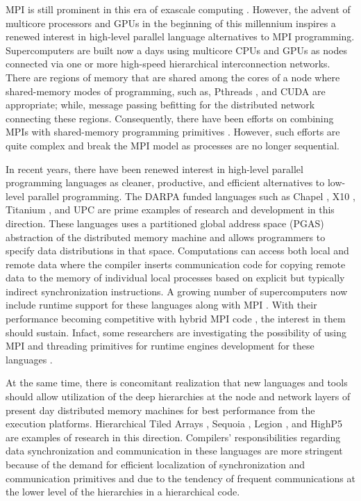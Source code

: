 \documentclass[ASNA,twocolumn]{USG} %
\begin{document}
{MPI is still prominent in this era of exascale computing \citep{https://doi.org/10.1002/cpe.4851}. However, the advent of multicore processors and GPUs in the beginning of this millennium inspires a renewed interest in high-level parallel language alternatives to MPI programming. Supercomputers are built now a days using multicore CPUs and GPUs as nodes connected via one or more high-speed hierarchical interconnection networks. There are regions of memory that are shared among the cores of a node where shared-memory modes of programming, such as, Pthreads \citep{10.5555/263953}, and CUDA \citep{10.1145/1365490.1365500} are appropriate; while, message passing befitting for the distributed network connecting these regions. Consequently, there have been efforts on combining MPIs with shared-memory programming primitives \citep{YANG2011266} \citep{doi:10.2514/6.2010-522}\citep{10.1007/978-3-540-88436-1_36}. However, such efforts are quite complex and break the MPI model as processes are no longer sequential.     
	
In recent years, there have been renewed interest in high-level parallel programming languages as cleaner, productive, and efficient alternatives to low-level parallel programming. The DARPA funded languages such as Chapel \citep{doi:10.1177/1094342007078442}, X10 \citep{10.1145/1229428.1229483}, Titanium \citep{titanium}, and UPC \citep{10.1145/1188455.1188483} are prime examples of research and development in this direction. These languages uses a partitioned global address space (PGAS) abstraction \citep{Yelick:2007:PPU:1278177.1278183} of the distributed memory machine and allows programmers to specify data distributions in that space. Computations can access both local and remote data where the compiler inserts communication code for copying remote data to the memory of individual local processes based on explicit but typically indirect synchronization instructions. A growing number of supercomputers now include runtime support for these languages along with MPI \citep{10.1145/2020373.2020378} \citep{5161076}. With their performance becoming competitive with hybrid MPI code \citep{Chamberlain2018ChapelCO}, the interest in them should sustain. Infact, some researchers are investigating the possibility of using MPI and threading primitives for runtime engines development for these languages \citep{1613273}.
	
At the same time, there is concomitant realization that new languages and tools should allow utilization of the deep hierarchies at the node and network layers of present day distributed memory machines for best performance from the execution platforms. Hierarchical Tiled Arrays \citep{10.1145/1122971.1122981}, Sequoia \citep{10.1145/1188455.1188543}, Legion \citep{10.5555/2388996.2389086}, and HighP5 \citep{Yanhaona:2015:RTA:2723772.2723774} are examples of research in this direction. Compilers' responsibilities regarding data synchronization and communication in these languages are more stringent because of the demand for efficient localization of synchronization and communication primitives and due to the tendency of frequent communications at the lower level of the hierarchies in a hierarchical code.
	
}
\end{document}
